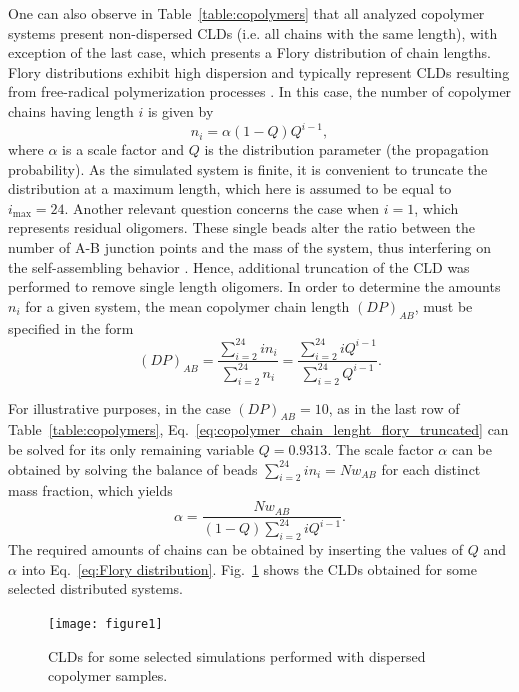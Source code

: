 \documentclass[
journal=mamobx,
manuscript=article,
]{achemso}
\begin{document}
One can also observe in Table~\ref{table:copolymers} that all analyzed copolymer systems present non-dispersed CLDs (i.e. all chains with the same length), with exception of the last case, which presents a Flory distribution of chain lengths.
Flory distributions exhibit high dispersion and typically represent CLDs resulting from free-radical polymerization processes \cite{Peebles_1971}.
In this case, the number of copolymer chains having length $i$ is given by
\begin{equation}
\label{eq:Flory distribution}
n_i = \alpha (1-Q)Q^{i-1},
\end{equation}
where $\alpha$ is a scale factor and $Q$ is the distribution parameter (the propagation probability).
As the simulated system is finite, it is convenient to truncate the distribution at a maximum length, which here is assumed to be equal to $i_\mathrm{max} = 24$.
Another relevant question concerns the case when $i=1$, which represents residual oligomers.
These single beads alter the ratio between the number of A-B junction points and the mass of the system, thus interfering on the self-assembling behavior \cite{Matsen_1996}.
Hence, additional truncation of the CLD was performed to remove single length oligomers.
In order to determine the amounts $n_i$ for a given system, the mean copolymer chain length $(DP)_{AB}$, must be specified in the form
\begin{equation}
\label{eq:copolymer_chain_lenght_flory_truncated}
(DP)_{AB} = \frac{\sum_{i=2}^{24} i n_i}{\sum_{i=2}^{24} n_i} = \frac{\sum_{i=2}^{24} i Q^{i-1}}{\sum_{i=2}^{24} Q^{i-1}}.
\end{equation}

For illustrative purposes, in the case $(DP)_{AB} = 10$, as in the last row of Table~\ref{table:copolymers}, Eq.~\eqref{eq:copolymer_chain_lenght_flory_truncated} can be solved  for its only remaining variable $Q = 0.9313$.
The scale factor $\alpha$ can be obtained by solving the balance of beads $\sum_{i=2}^{24} i n_i = N w_{AB}$ for each distinct mass fraction, which yields
\begin{equation}
\alpha = \frac{N w_{AB}}{(1-Q) \sum_{i=2}^{24} i Q^{i-1}}.
\end{equation}
The required amounts of chains can be obtained by inserting the values of $Q$ and $\alpha$ into Eq.~\eqref{eq:Flory distribution}.
Fig.~\ref{fig:Figure_1} shows the CLDs obtained for some selected distributed systems.

\begin{figure}
	\centering
	\texttt{[image: figure1]}
	\caption{CLDs for some selected simulations performed with dispersed copolymer samples.}
	\label{fig:Figure_1}
\end{figure}
\end{document}
